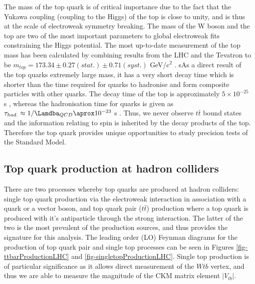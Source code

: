 The mass of the top quark is of critical importance due to the fact that the Yukawa coupling (coupling to the Higgs) of the top is close to unity, and is thus at the scale of electroweak symmetry breaking. The mass of the W boson and the top are two of the most important parameters to global electroweak fits constraining the Higgs potential. The most up-to-date measurement of the top mass has been calculated by combining results from the LHC and the Tevatron to be $m_{top} = 173.34 \pm 0.27(stat.) \pm 0.71(syst.)$ GeV/c$^2$ \cite{ATLAS:2014wva}. sAs a direct result of the top quarks extremely large mass, it has a very short decay time which is shorter than the time required for quarks to hadronise and form composite particles with other quarks. The decay time of the top is approximately $5 \times 10^{-25}$ s \cite{Quadt:2007jk}, whereas the hadronisation time for quarks is given as $\tau_{had.} \approx 1/\Lamdba_{QCD} \aprox 10^{-23}$ s \cite{0954-3899-37-7A-075021}. Thus, we never observe $t\bar{t}$ bound states and the information relating to spin is inherited by the decay products of the top. Therefore the top quark provides unique opportunities to study precision tests of the Standard Model.


\subsection{Top quark production at hadron colliders} \label{subsec-TopProduction}

There are two processes whereby top quarks are produced at hadron colliders: single top quark production via the electroweak interaction in association with a quark or a vector boson, and top quark pair ($t\bar{t}$) production where a top quark is produced with it's antiparticle through the strong interaction. The latter of the two is the most prevalent of the production sources, and thus provides the signature for this analysis. The leading order (LO) Feynman diagrams for the production of top quark pair and single top processes can be seen in Figures \ref{fig-ttbarProductionLHC} and \ref{fig-singletopProductionLHC}. Single top production is of particular significance as it allows direct measurement of the $Wtb$ vertex, and thus we are able to measure the magnitude of the CKM matrix element $|V_{tb}|$.

